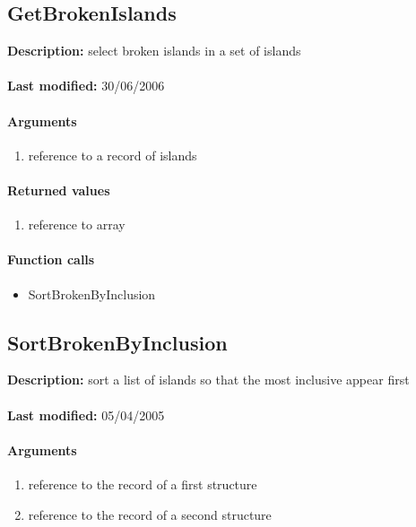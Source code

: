 \subsection{GetBrokenIslands}
\textbf{Description:} select broken islands in a set of islands\\
\\\textbf{Last modified:} 30/06/2006

\paragraph{Arguments}
\begin{enumerate}
\item reference to a record of islands
\end{enumerate}

\paragraph{Returned values}
\begin{enumerate}
\item reference to array
\end{enumerate}

\paragraph{Function calls}
\begin{itemize}
\item SortBrokenByInclusion
\end{itemize}

\subsection{SortBrokenByInclusion}
\textbf{Description:} sort a list of islands so that the most inclusive appear first\\
\\\textbf{Last modified:} 05/04/2005

\paragraph{Arguments}
\begin{enumerate}
\item reference to the record of a first structure
\item reference to the record of a second structure
\end{enumerate}

